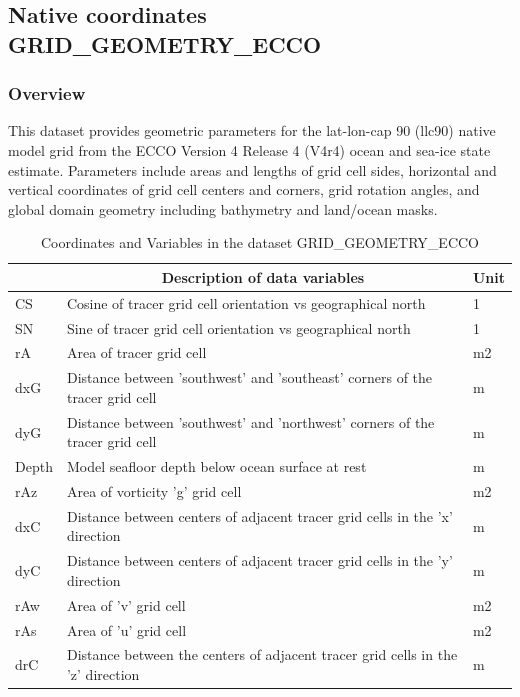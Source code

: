 \subsection{Native coordinates GRID\_GEOMETRY\_ECCO}
\newp
\subsubsection{Overview}
This dataset provides geometric parameters for the lat-lon-cap 90 (llc90) native model grid from the ECCO Version 4 Release 4 (V4r4) ocean and sea-ice state estimate. Parameters include areas and lengths of grid cell sides, horizontal and vertical coordinates of grid cell centers and corners, grid rotation angles, and global domain geometry including bathymetry and land/ocean masks. 
\begin{longtable}{|m{}|m{}|m{}|}
\caption{Coordinates and Variables in the dataset GRID\_GEOMETRY\_ECCO}
\label{tab:table-GRID_GEOMETRY_ECCO-fields} \\ 
\hline \endhead \hline \endfoot
\rowcolor{lightgray} \multicolumn{1}{|c|}{\textbf{Variables}} & \multicolumn{1}{|c|}{\textbf{Description of data variables}} &  \multicolumn{1}{|c|}{\textbf{Unit}}\\ \hline
CS &Cosine of tracer grid cell orientation vs geographical north &1  \\ \hline
SN &Sine of tracer grid cell orientation vs geographical north &1  \\ \hline
rA &Area of tracer grid cell &m2  \\ \hline
dxG &Distance between 'southwest' and 'southeast' corners of the tracer grid cell &m  \\ \hline
dyG &Distance between 'southwest' and 'northwest' corners of the tracer grid cell &m  \\ \hline
Depth &Model seafloor depth below ocean surface at rest &m  \\ \hline
rAz &Area of vorticity 'g' grid cell &m2  \\ \hline
dxC &Distance between centers of adjacent tracer grid cells in the 'x' direction &m  \\ \hline
dyC &Distance between centers of adjacent tracer grid cells in the 'y' direction &m  \\ \hline
rAw &Area of 'v' grid cell &m2  \\ \hline
rAs &Area of 'u' grid cell &m2  \\ \hline
drC &Distance between the centers of adjacent tracer grid cells in the 'z' direction &m  \\ \hline

\end{longtable}
